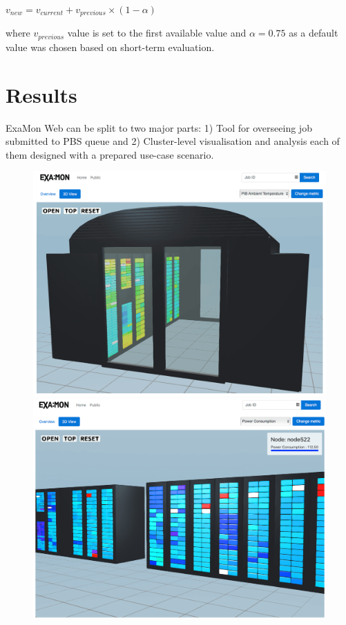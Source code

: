 \documentclass[a4paper, twoside]{article}
\begin{document}
\begin{multicols}{3}
$v_{new} = v_{current} + v_{previous} \times (1 - \alpha)$

\noindent where $v_{previous}$ value is set to the first available value and $\alpha = 0.75$ as a default value was chosen based on short-term evaluation.

\section*{Results}
ExaMon Web can be split to two major parts: 1) Tool for overseeing job submitted to PBS queue and 2) Cluster-level visualisation and analysis each of them designed with a prepared use-case scenario.

\begin{figure}[t!]
    \includegraphics[width=2\columnwidth+\columnsep]{public-3d}
    \hspace{\columnsep}
    \begin{minipage}[b]{\columnwidth}
        \includegraphics[width=\linewidth]{3d-open}

\end{minipage}
\end{figure}
\end{multicols}
\end{document}
